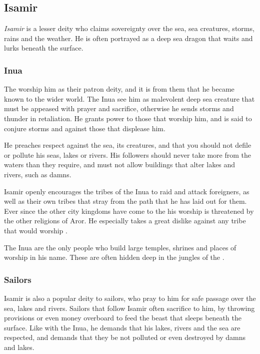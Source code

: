\subsection{Isamir}
\label{sec:Isamir}

\emph{Isamir} is a lesser deity who claims sovereignty over the sea, sea
creatures, storms, rains and the weather. He is often portrayed as a deep
sea dragon that waits and lurks beneath the surface.

\subsubsection{Inua}

The  worship him as their patron deity, and it is from
them that he became known to the wider world. The Inua see him as malevolent
deep sea creature that must be appeased with prayer and sacrifice, otherwise
he sends storms and thunder in retaliation. He grants power to those that
worship him, and is said to conjure storms and against those that displease
him.

He preaches respect against the sea, its creatures, and that you should not
defile or pollute his seas, lakes or rivers. His followers should never take
more from the waters than they require, and must not allow buildings that
alter lakes and rivers, such as damns.

Isamir openly encourages the tribes of the Inua to raid and attack foreigners,
as well as their own tribes that stray from the path that he has laid out for
them. Ever since the other city kingdoms have come to the
 his worship is threatened by the other religions
of Aror. He especially takes a great dislike against any tribe that would
worship .

The Inua are the only people who build large temples, shrines and places of
worship in his name. These are often hidden deep in the jungles of the
.

\subsubsection{Sailors}

Isamir is also a popular deity to sailors, who pray to him for safe passage
over the sea, lakes and rivers. Sailors that follow Isamir often sacrifice
to him, by throwing provisions or even money overboard to feed the beast
that sleeps beneath the surface. Like with the Inua, he demands that his
lakes, rivers and the sea are respected, and demands that they be not
polluted or even destroyed by damns and lakes.

